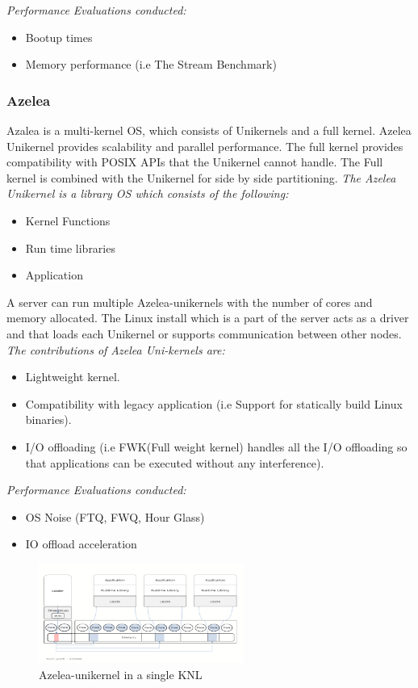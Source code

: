 \emph{Performance Evaluations conducted:}
\begin{itemize}
  \item Bootup times 
  \item Memory performance (i.e The Stream Benchmark)
\end{itemize}

\subsubsection{Azelea \cite{Azelea}} 
Azalea is a multi-kernel OS, which consists of Unikernels and a full kernel. Azelea Unikernel provides scalability and parallel performance. 
The full kernel provides compatibility with POSIX APIs that the Unikernel cannot handle. The Full kernel is combined with the Unikernel for 
side by side partitioning. \emph{The Azelea Unikernel is a library OS which consists of the following:}
\begin{itemize}
  \item Kernel Functions 
  \item Run time libraries 
  \item Application 
\end{itemize}
A server can run multiple Azelea-unikernels with the number of cores and memory allocated. The Linux install which is a part of 
the server acts as a driver and that loads each Unikernel or supports communication between other nodes. 
\emph{The contributions of Azelea Uni-kernels are:}
\begin{itemize}
  \item Lightweight kernel.
  \item Compatibility with legacy application (i.e Support for statically build Linux binaries).
  \item I/O offloading (i.e FWK(Full weight kernel) handles all the I/O offloading so that applications can be executed without any interference). 
\end{itemize}

\emph{Performance Evaluations conducted:}
\begin{itemize}
  \item OS Noise (FTQ, FWQ, Hour Glass) \cite{AzeleaOSNoise}
  \item IO offload acceleration \cite{AzeleaIOAccerleration}
\end{itemize}

\begin{figure}[htbp!] 
  \centering    
  \includegraphics[width=0.6\textwidth]{AzeleaKNL}
  \caption[Azelea]{Azelea-unikernel in a single KNL \cite{Azelea}}
  \label{fig:AzeleaKNL}
  \end{figure}

